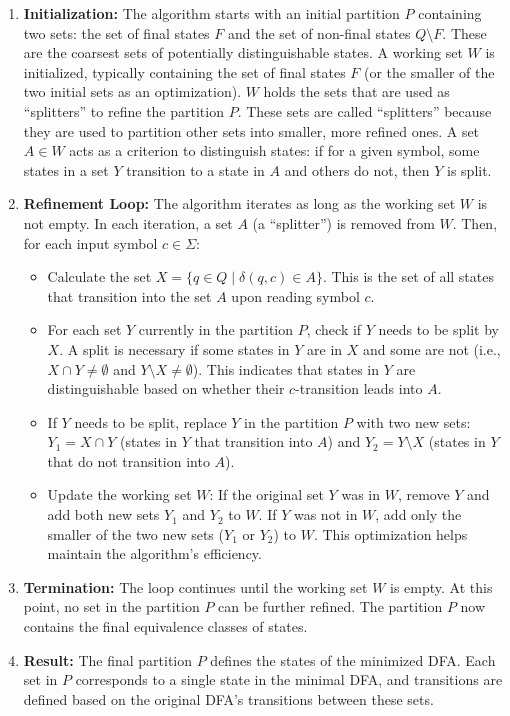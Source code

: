 \begin{enumerate}
    \item \textbf{Initialization:} The algorithm starts with an initial partition $P$ containing two sets: the set of final states $F$ and the set of non-final states $Q \setminus F$. These are the coarsest sets of potentially distinguishable states. A working set $W$ is initialized, typically containing the set of final states $F$ (or the smaller of the two initial sets as an optimization). $W$ holds the sets that are used as ``splitters'' to refine the partition $P$. These sets are called ``splitters'' because they are used to partition other sets into smaller, more refined ones. A set $A \in W$ acts as a criterion to distinguish states: if for a given symbol, some states in a set $Y$ transition to a state in $A$ and others do not, then $Y$ is split.

    \item \textbf{Refinement Loop:} The algorithm iterates as long as the working set $W$ is not empty. In each iteration, a set $A$ (a ``splitter'') is removed from $W$. Then, for each input symbol $c \in \Sigma$:
        \begin{itemize}
            \item Calculate the set $X = \{q \in Q \mid \delta(q, c) \in A\}$. This is the set of all states that transition into the set $A$ upon reading symbol $c$.
            \item For each set $Y$ currently in the partition $P$, check if $Y$ needs to be split by $X$. A split is necessary if some states in $Y$ are in $X$ and some are not (i.e., $X \cap Y \neq \emptyset$ and $Y \setminus X \neq \emptyset$). This indicates that states in $Y$ are distinguishable based on whether their $c$-transition leads into $A$.
            \item If $Y$ needs to be split, replace $Y$ in the partition $P$ with two new sets: $Y_1 = X \cap Y$ (states in $Y$ that transition into $A$) and $Y_2 = Y \setminus X$ (states in $Y$ that do not transition into $A$).
            \item Update the working set $W$: If the original set $Y$ was in $W$, remove $Y$ and add both new sets $Y_1$ and $Y_2$ to $W$. If $Y$ was not in $W$, add only the smaller of the two new sets ($Y_1$ or $Y_2$) to $W$. This optimization helps maintain the algorithm's efficiency.
        \end{itemize}

    \item \textbf{Termination:} The loop continues until the working set $W$ is empty. At this point, no set in the partition $P$ can be further refined. The partition $P$ now contains the final equivalence classes of states.

    \item \textbf{Result:} The final partition $P$ defines the states of the minimized DFA. Each set in $P$ corresponds to a single state in the minimal DFA, and transitions are defined based on the original DFA's transitions between these sets.
\end{enumerate}

